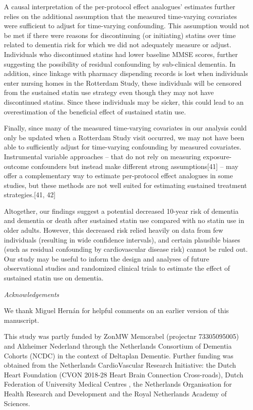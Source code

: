\documentclass[
]{book}
\begin{document}
A causal interpretation of the per-protocol effect analogues' estimates further relies on the additional assumption that the measured time-varying covariates were sufficient to adjust for time-varying confounding. This assumption would not be met if there were reasons for discontinuing (or initiating) statins over time related to dementia risk for which we did not adequately measure or adjust. Individuals who discontinued statins had lower baseline MMSE scores, further suggesting the possibility of residual confounding by sub-clinical dementia. In addition, since linkage with pharmacy dispending records is lost when individuals enter nursing homes in the Rotterdam Study, these individuals will be censored from the sustained statin use strategy even though they may not have discontinued statins. Since these individuals may be sicker, this could lead to an overestimation of the beneficial effect of sustained statin use.

Finally, since many of the measured time-varying covariates in our analysis could only be updated when a Rotterdam Study visit occurred, we may not have been able to sufficiently adjust for time-varying confounding by measured covariates. Instrumental variable approaches -- that do not rely on measuring exposure-outcome confounders but instead make different strong assumptions{[}41{]} -- may offer a complementary way to estimate per-protocol effect analogues in some studies, but these methods are not well suited for estimating sustained treatment strategies.{[}41, 42{]}

Altogether, our findings suggest a potential decreased 10-year risk of dementia and dementia or death after sustained statin use compared with no statin use in older adults. However, this decreased risk relied heavily on data from few individuals (resulting in wide confidence intervals), and certain plausible biases (such as residual confounding by cardiovascular disease risk) cannot be ruled out. Our study may be useful to inform the design and analyses of future observational studies and randomized clinical trials to estimate the effect of sustained statin use on dementia.

\emph{Acknowledgements}

We thank Miguel Hernán for helpful comments on an earlier version of this manuscript.

This study was partly funded by ZonMW Memorabel (projectnr 73305095005) and Alzheimer Nederland through the Netherlands Consortium of Dementia Cohorts (NCDC) in the context of Deltaplan Dementie. Further funding was obtained from the Netherlands CardioVascular Research Initiative: the Dutch Heart Foundation (CVON 2018-28 Heart Brain Connection Cross-roads), Dutch Federation of University Medical Centres , the Netherlands Organisation for Health Research and Development and the Royal Netherlands Academy of Sciences.
\end{document}
